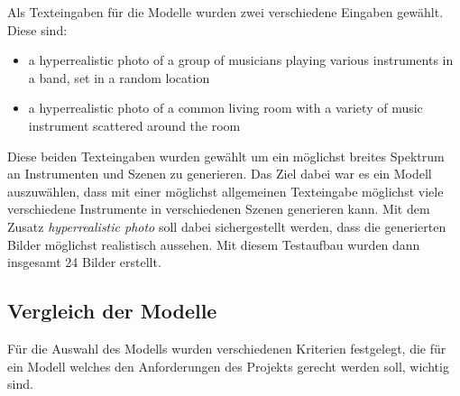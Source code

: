 Als Texteingaben für die Modelle wurden zwei verschiedene Eingaben gewählt. Diese sind:
\begin{itemize}
    \item a hyperrealistic photo of a group of musicians playing various instruments in a band, set in a random location
    \item a hyperrealistic photo of a common living room with a variety of music instrument scattered around the room
\end{itemize}
Diese beiden Texteingaben wurden gewählt um ein möglichst breites Spektrum an Instrumenten und Szenen zu generieren. Das Ziel dabei war es ein Modell auszuwählen, dass mit einer möglichst allgemeinen Texteingabe möglichst viele verschiedene Instrumente in verschiedenen Szenen generieren kann. Mit dem Zusatz \emph{hyperrealistic photo} soll dabei sichergestellt werden, dass die generierten Bilder möglichst realistisch aussehen. 
Mit diesem Testaufbau wurden dann insgesamt 24 Bilder erstellt.

\subsection{Vergleich der Modelle}
Für die Auswahl des Modells wurden verschiedenen Kriterien festgelegt, die für ein Modell welches den Anforderungen des Projekts gerecht werden soll, wichtig sind.

